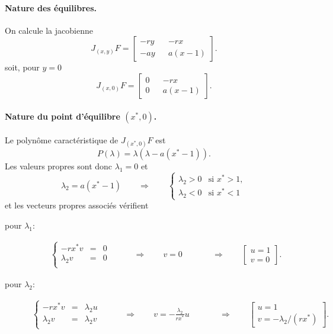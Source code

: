 \paragraph*{Nature des équilibres.}
On calcule la jacobienne
$$
J_{(x, y)}F = 
  \left[\begin{array}{rcr} 
    - r y & & -r x \\
    - a y & & a (x - 1)
  \end{array}\right].
$$
soit, pour $y = 0$
$$
J_{(x, 0)}F = 
  \left[\begin{array}{rcr} 
    0 & & -r x \\
    0 & & a (x - 1)
  \end{array}\right].
$$

\paragraph*{Nature du point d'équilibre $(x^*, 0)$.}
Le polynôme caractéristique de $J_{(x^*, 0)}F$ est
$$
P(\lambda) = \lambda (\lambda - a (x^* - 1)).
$$
Les valeurs propres sont donc $\lambda_1 = 0$ et 
$$
\lambda_2 = a (x^* - 1) 
\qquad \Rightarrow \qquad 
\left\{\begin{array}{ll} 
  \lambda_2 > 0 & \text{si } x^* > 1, \\
  \lambda_2 < 0 & \text{si } x^* < 1
\end{array} \right.
$$
et les vecteurs propres associés vérifient 
\begin{description}
  \item[pour $\lambda_1$:] 
  \begin{align*}
  \left\{\begin{array}{rcl}
      -r x^* v & = & 0 \\
      \lambda_2 v & = & 0 \\
    \end{array}\right.
    \qquad & \Rightarrow \qquad 
    v = 0 &
    \qquad & \Rightarrow \qquad 
    \left[\begin{array}{c} u=1 \\ v=0 \end{array}\right].
    \end{align*}
  \item[pour $\lambda_2$:]
    \begin{align*}
      \left\{\begin{array}{rcl}
          -r x^* v & = & \lambda_2 u \\
          \lambda_2 v & = & \lambda_2 v \\
        \end{array}\right.
        \qquad & \Rightarrow \qquad 
        v = - \frac{\lambda_2}{rx^*} u &
        \qquad & \Rightarrow \qquad 
        \left[\begin{array}{l} u=1 \\ v=-\lambda_2/(rx^*) \end{array}\right].
    \end{align*}  
\end{description}

